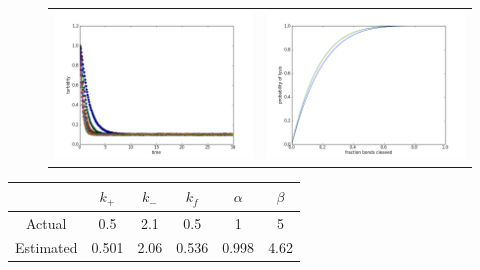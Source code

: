 \documentclass[11pt]{amsart}
\begin{document}
\begin{figure}[htbp] %
   \begin{tabular}{c c}
   \includegraphics[width=3.5in]{turbidity6.png}& 
   \includegraphics[width=3.5in]{susceptibility6.png}  
   \end{tabular}
\end{figure}

\begin{center}
    \begin{tabular}{ | c | c | c | c | c | c |}
    \hline
     & $k_{+}$ & $k_{-}$ & $k_{f}$ & $\alpha$ & $\beta$\\ \hline
    Actual & 0.5 & 2.1 & 0.5  & 1 & 5\\ \hline
    Estimated & 0.501 & 2.06 & 0.536  & 0.998 & 4.62 \\ \hline
    \hline
    \end{tabular}
\end{center}
\end{document}
